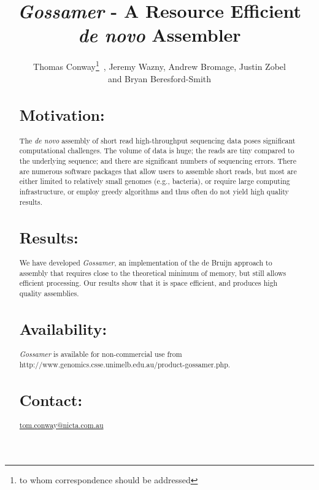 \documentclass{bioinfo}
\newcommand{\Gossamer}{\textit{Gossamer}}
\begin{document}

\title[\Gossamer{}]{\Gossamer{} - A Resource Efficient {\em de novo} Assembler}
\author[Conway \textit{et~al}]{Thomas Conway\footnote{to whom correspondence should be addressed}\ , Jeremy Wazny, Andrew Bromage, Justin Zobel \\ and Bryan Beresford-Smith}
\address{NICTA Victoria Research Laboratory, Department of Computer Science and Software Engineering, The University of Melbourne, Parkville, Australia\\
}





\maketitle

\begin{abstract}

\section{Motivation:}
The \textit{de novo} assembly of short read high-throughput sequencing
data poses significant computational challenges.
The volume of data is huge;
the reads are tiny compared to the underlying sequence; and
there are significant numbers of sequencing errors.  
There are numerous software
packages that allow users to assemble short reads,
but most are either limited to
relatively small genomes (e.g., bacteria),
or require large computing infrastructure,
or employ greedy algorithms and thus
often do not yield high quality results.

\section{Results:}
We have developed \Gossamer{}, an implementation
of the de Bruijn approach to assembly that requires
close to the theoretical minimum of memory,
but still allows efficient processing.
Our results show that it is space efficient,
and produces high quality assemblies.


\section{Availability:}
\Gossamer{} is available for non-commercial use 
from http://www.genomics.csse.unimelb.edu.au/product-gossamer.php.

\section{Contact:} \href{tom.conway@nicta.com.au}{tom.conway@nicta.com.au}
\end{abstract}
\end{document}
